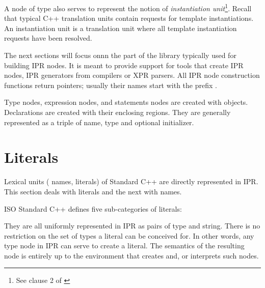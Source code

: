\documentclass[11pt]{article}
\begin{document}
A node of type  also serves to represent the notion of 
\emph{instantiation unit}\footnote{See clause 2 of \cite{iso98, iso03}}.
Recall that typical C++ translation units contain requests for template
instantiations.  An instantiation unit is a translation unit where all
template instantiation requests have been resolved.


The next sections will focus onnn the part of the library typically used for
building IPR nodes.  It is meant to provide support for tools that create IPR
nodes, \eg{} IPR generators from compilers or XPR parsers.  All IPR
node construction functions return pointers; usually their names start with
the prefix .  

Type nodes, expression nodes, and statements nodes are created with
 objects.  Declarations are created with their enclosing
regions.  They are generally represented as a triple of name, type and
optional initializer.


\section{Literals}
\label{sec:literals}

Lexical units (\eg{} names, literals) of Standard C++ are directly represented
in IPR. This section deals with literals and the next with names.

ISO Standard C++ defines five sub-categories of literals:
\begin{Grammar}
\end{Grammar}
They are all uniformly represented in IPR as pairs of type and string.
There is no restriction on the set of types a literal can be conceived for.
In other words, any type node in IPR can serve to create a literal.  The
semantics of the resulting node is entirely up to the environment that creates
and, or interprets such nodes. 

\end{document}
